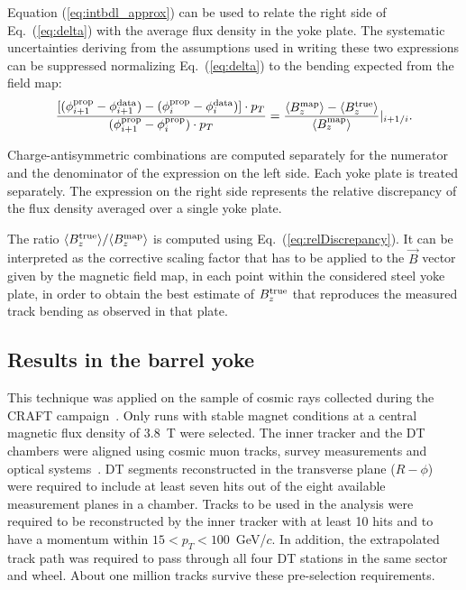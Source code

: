 Equation (\ref{eq:intbdl_approx}) can be used to relate the right side
of Eq.~(\ref{eq:delta}) with the average flux density in the yoke
plate. The systematic uncertainties deriving from the
assumptions used in writing these
two expressions can be suppressed normalizing Eq.~(\ref{eq:delta}) to
the bending expected from the field map:
\begin{equation}
\frac{[(\phi^{\rm prop}_{i+1}-\phi^{\rm data}_{i+1}) -
(\phi^{\rm prop}_{i}-\phi^{\rm data}_{i})]\cdot p_{T}}
{(\phi^{\rm prop}_{i+1}-\phi^{\rm prop}_{i})\cdot p_{T}} =
\frac{\langle B^{\rm map}_z\rangle-\langle B^{\rm true}_z\rangle}{\langle
  B^{\rm map}_z\rangle}|_{i+1/i}.
\label{eq:relDiscrepancy}
\end{equation}

Charge-antisymmetric combinations are computed
separately for the numerator and the denominator of the expression on
the left side. Each yoke plate is treated separately. The expression
on the right side represents the relative discrepancy of the
flux density averaged over a single yoke plate.

The ratio $\langle{B_z^{\rm true}}\rangle/\langle{B_z^{\rm map}}\rangle$ is computed using
Eq.~(\ref{eq:relDiscrepancy}).
It can be interpreted as the corrective scaling factor that has to
be applied to the $\vec{B}$ vector given by the magnetic
field map, in each point within the considered steel yoke plate, in order to
obtain the best estimate of ${B_z^{\rm true}}$ that reproduces
the measured track bending as observed in that plate.

\subsection{Results in the barrel yoke}
\label{sec:CRAFTBarrelResults}

This technique was applied on the sample of cosmic rays collected
during the CRAFT campaign~\cite{CRAFTGeneral}. Only runs with stable
magnet conditions at a central magnetic flux density of 3.8~T were
selected. The inner tracker and  the DT chambers were aligned using
cosmic muon tracks, survey measurements and optical
systems~\cite{CFTTkAlignment, CFTMuTrackAlignment, MuonHWAlign}.
DT segments reconstructed in the transverse plane
($R-\phi$) were required to include at least seven hits out of the
eight available measurement planes in a chamber.
Tracks to be used in the analysis were required to be reconstructed by
the inner tracker with at least 10 hits and to have a momentum within
$15 < p_T < 100$~GeV/$c$.
In addition, the extrapolated track path was required to pass through
all four DT stations in the same sector and wheel.
About one million tracks survive these pre-selection requirements.

